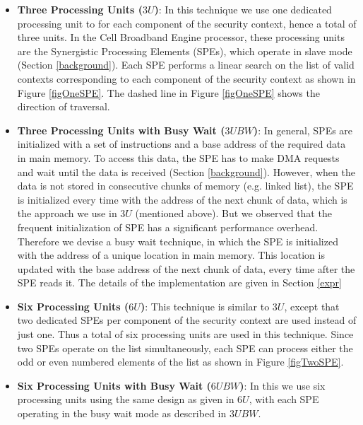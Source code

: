 \documentclass[conference]{IEEEtran}
\newcommand{\eat}[1]{}
\begin{document}
\begin{itemize}

\item \textbf{Three Processing Units ($3U$)}: In this technique we use
  one dedicated processing unit to for each component of the security
  context, hence a total of three units. In the Cell Broadband Engine
  processor, these processing units are the Synergistic Processing
  Elements (SPEs), which operate in slave mode (Section
  \ref{background}). Each SPE performs a linear search on the list of
  valid contexts corresponding to each component of the security
  context as shown in Figure \ref{figOneSPE}. The dashed line in
  Figure \ref{figOneSPE} shows the direction of traversal.

\item \textbf{Three Processing Units with Busy Wait ($3UBW$)}: In
  general, SPEs are initialized with a set of instructions and a base
  address of the required data in main memory. To access this data,
  the SPE has to make DMA requests and wait until the data is received
  (Section \ref{background}). However, when the data is not stored in
  consecutive chunks of memory (e.g. linked list), the SPE is
  initialized every time with the address of the next chunk of data,
  which is the approach we use in $3U$ (mentioned above). But we
  observed that the frequent initialization of SPE has a significant
  performance overhead. Therefore we devise a busy wait technique, in
  which the SPE is initialized with the address of a unique location
  in main memory\eat{ instead of the base address of the data}. This
  location is updated with the base address of the next chunk of data,
  every time after the SPE reads it. The details of the implementation
  are given in Section \ref{expr}

\item \textbf{Six Processing Units ($6U$)}: This technique is similar
  to $3U$, except that two dedicated SPEs per component of the
  security context are used instead of just one. Thus a total of six
  processing units are used in this technique. Since two SPEs operate
  on the list simultaneously, each SPE can process either the odd or
  even numbered elements of the list as shown in Figure
  \ref{figTwoSPE}.

\item \textbf{Six Processing Units with Busy Wait ($6UBW$)}: In this
  we use six processing units using the same design as given in $6U$,
  with each SPE operating in the busy wait mode as described in
  $3UBW$.

\end{itemize}
\end{document}
